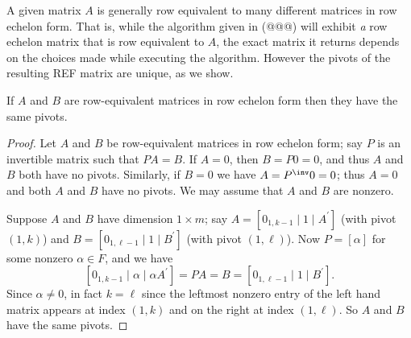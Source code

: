 A given matrix $A$ is generally row equivalent to many different matrices in row echelon form. That is, while the algorithm given in (@@@) will exhibit \emph{a} row echelon matrix that is row equivalent to $A$, the exact matrix it returns depends on the choices made while executing the algorithm. However the pivots of the resulting REF matrix are unique, as we show.

\begin{prp}
\label{prp:pivots}
If $A$ and $B$ are row-equivalent matrices in row echelon form then they have the same pivots.
\end{prp}

\begin{proof}
Let $A$ and $B$ be row-equivalent matrices in row echelon form; say $P$ is an invertible matrix such that $PA = B$. If $A = 0$, then $B = P0 = 0$, and thus $A$ and $B$ both have no pivots. Similarly, if $B = 0$ we have $A = P^\inv 0 = 0$; thus $A = 0$ and both $A$ and $B$ have no pivots. We may assume that $A$ and $B$ are nonzero.

Suppose $A$ and $B$ have dimension $1 \times m$; say $A = [0_{1,k-1} \mid 1 \mid A^\prime]$ (with pivot $(1,k)$) and $B = [0_{1,\ell-1} \mid 1 \mid B^\prime]$ (with pivot $(1,\ell)$). Now $P = [\alpha]$ for some nonzero $\alpha \in F$, and we have \[[0_{1,k-1} \mid \alpha \mid \alpha A^\prime] = PA = B = [0_{1,\ell-1} \mid 1 \mid B^\prime].\] Since $\alpha \neq 0$, in fact $k = \ell$ since the leftmost nonzero entry of the left hand matrix appears at index $(1,k)$ and on the right at index $(1,\ell)$. So $A$ and $B$ have the same pivots.


\end{proof}
